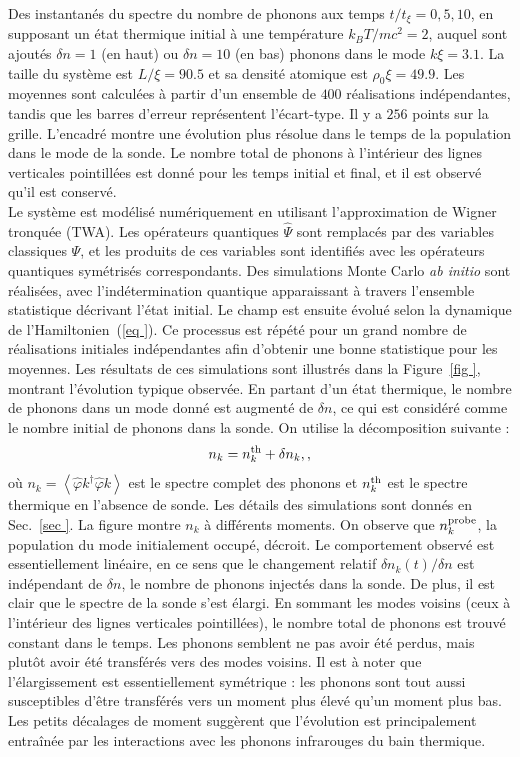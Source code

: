 \documentclass[aps,prd,notitlepage,amsfonts,amssymb,amsmath,nofootinbib,superscriptaddress,longbibliography]{revtex4-2}
\newcommand{\trad}[1]{\textcolor{tradcolor}{#1}}
\newcommand{\resumefr}[1]{\textcolor{resumecolor}{#1}}
\begin{document}
\trad{Des instantanés du spectre du nombre de phonons aux temps $t/t_{\xi} = 0, 5, 10$, en supposant un état thermique initial à une température $k_{B} T / mc^2 = 2$, auquel sont ajoutés $\delta n = 1$ (en haut) ou $\delta n = 10$ (en bas) phonons dans le mode $k \xi = 3.1$. La taille du système est $L/\xi = 90.5$ et sa densité atomique est $\rho_0 \xi = 49.9$. Les moyennes sont calculées à partir d'un ensemble de $400$ réalisations indépendantes, tandis que les barres d'erreur représentent l'écart-type. Il y a $256$ points sur la grille. L'encadré montre une évolution plus résolue dans le temps de la population dans le mode de la sonde. Le nombre total de phonons à l'intérieur des lignes verticales pointillées est donné pour les temps initial et final, et il est observé qu'il est conservé.}\\

\resumefr{
Le système est modélisé numériquement en utilisant l'approximation de Wigner tronquée (TWA). Les opérateurs quantiques $\hat{\Psi}$ sont remplacés par des variables classiques $\Psi$, et les produits de ces variables sont identifiés avec les opérateurs quantiques symétrisés correspondants. Des simulations Monte Carlo {\it ab initio} sont réalisées, avec l'indétermination quantique apparaissant à travers l'ensemble statistique décrivant l'état initial. Le champ est ensuite évolué selon la dynamique de l'Hamiltonien~(\ref{eq
}). Ce processus est répété pour un grand nombre de réalisations initiales indépendantes afin d'obtenir une bonne statistique pour les moyennes.
Les résultats de ces simulations sont illustrés dans la Figure~\ref{fig
}, montrant l'évolution typique observée. En partant d'un état thermique, le nombre de phonons dans un mode donné est augmenté de $\delta n$, ce qui est considéré comme le nombre initial de phonons dans la sonde. On utilise la décomposition suivante :
\begin{equation*}
n_{k} = n_{k}^{\rm th} + \delta n_{k} ,,
\end{equation*}
où $n_{k} = \left\langle \hat{\varphi}{k}^{\dagger}\hat{\varphi}{k} \right\rangle$ est le spectre complet des phonons et $n_{k}^{\rm th}$ est le spectre thermique en l'absence de sonde.
Les détails des simulations sont donnés en Sec.~\ref{sec
}. La figure montre $n_{k}$ à différents moments. On observe que $n_{k}^{\rm probe}$, la population du mode initialement occupé, décroit. Le comportement observé est essentiellement linéaire, en ce sens que le changement relatif $\delta n_{k}(t) / \delta n$ est indépendant de $\delta n$, le nombre de phonons injectés dans la sonde. De plus, il est clair que le spectre de la sonde s'est élargi. En sommant les modes voisins (ceux à l'intérieur des lignes verticales pointillées), le nombre total de phonons est trouvé constant dans le temps. Les phonons semblent ne pas avoir été perdus, mais plutôt avoir été transférés vers des modes voisins. Il est à noter que l'élargissement est essentiellement symétrique : les phonons sont tout aussi susceptibles d'être transférés vers un moment plus élevé qu'un moment plus bas. Les petits décalages de moment suggèrent que l'évolution est principalement entraînée par les interactions avec les phonons infrarouges du bain thermique.
}
\end{document}
